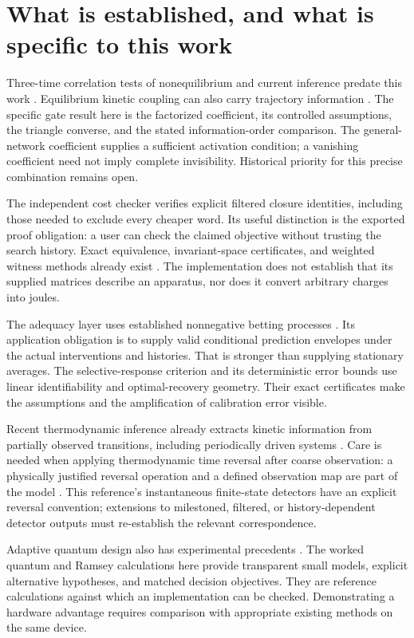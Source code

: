 \section{What is established, and what is specific to this work}

Three-time correlation tests of nonequilibrium and current inference predate
this work \cite{physics-qian}. Equilibrium kinetic coupling can also carry trajectory
information \cite{p_barato}. The specific gate result here is the factorized
coefficient, its controlled assumptions, the triangle converse, and the stated
information-order comparison. The general-network coefficient supplies a
sufficient activation condition; a vanishing coefficient need not imply
complete invisibility. Historical priority for this precise combination
remains open.

The independent cost checker verifies explicit filtered closure identities,
including those needed to exclude every cheaper word. Its useful distinction
is the exported proof obligation: a user can check the claimed objective
without trusting the search history. Exact equivalence, invariant-space
certificates, and weighted witness methods already exist
\cite{f_kiefer,f_thon}. The implementation does not establish that its supplied
matrices describe an apparatus, nor does it convert arbitrary charges into
joules.

The adequacy layer uses established nonnegative betting processes
\cite{caWaudbySmithRamdas2024,p_intervals}. Its application obligation is to supply valid
conditional prediction envelopes under the actual interventions and histories.
That is stronger than supplying stationary averages. The selective-response
criterion and its deterministic error bounds use linear identifiability and
optimal-recovery geometry. Their exact certificates make the assumptions and
the amplification of calibration error visible.

Recent thermodynamic inference already extracts kinetic information from
partially observed transitions, including periodically driven systems
\cite{p_maier}. Care is needed when applying thermodynamic time reversal after
coarse observation: a physically justified reversal operation and a defined
observation map are part of the model \cite{p_dieball}. This reference's
instantaneous finite-state detectors have an explicit reversal convention;
extensions to milestoned, filtered, or history-dependent detector outputs
must re-establish the relevant correspondence.

Adaptive quantum design also has experimental precedents
\cite{p_stace,physics-bonato}. The worked quantum and Ramsey calculations here
provide transparent small models, explicit alternative hypotheses, and
matched decision objectives. They are reference calculations against which
an implementation can be checked. Demonstrating a hardware advantage
requires comparison with appropriate existing methods on the same device.


